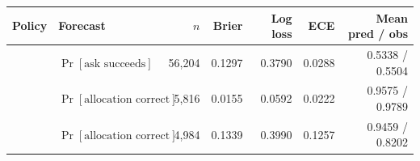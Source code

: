 \begin{tabular}{llrrrrr}
\toprule
Policy & Forecast & $n$ & Brier & Log loss & ECE & Mean pred / obs \\
\midrule
\vfast{} & $\Pr[\text{ask succeeds}]$ & 56{,}204 & 0.1297 & 0.3790 & 0.0288 & 0.5338 / 0.5504 \\
\vfast{} & $\Pr[\text{allocation correct}]$ & 5{,}816 & 0.0155 & 0.0592 & 0.0222 & 0.9575 / 0.9789 \\
\midrule
\vthree{} & $\Pr[\text{allocation correct}]$ & 4{,}984 & 0.1339 & 0.3990 & 0.1257 & 0.9459 / 0.8202 \\
\bottomrule
\end{tabular}